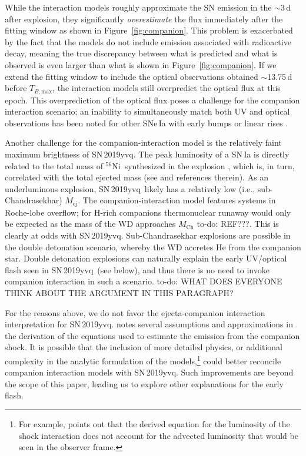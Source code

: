 \documentclass[twocolumn]{aastex63}
\newcommand{\todo}[1]{{\color{magenta} to-do: {#1}}}
\newcommand{\tbmax}{$T_{B,\mathrm{max}}$}
\newcommand{\radni}{$^{56}$Ni}
\newcommand{\sn}{SN\,2019yvq}
\begin{document}
While the interaction models roughly approximate the SN emission in the
$\sim$3\,d after explosion, they significantly \textit{overestimate} the flux
immediately after the fitting window as shown in Figure~\ref{fig:companion}.
This problem is exacerbated by the fact that the models do not include
emission associated with radioactive decay, meaning the true discrepancy
between what is predicted and what is observed is even larger than what is
shown in Figure~\ref{fig:companion}. If we extend the fitting window to
include the optical observations obtained $\sim$13.75\,d before \tbmax, the
interaction models still overpredict the optical flux at this epoch. This
overprediction of the optical flux poses a challenge for the companion
interaction scenario; an inability to simultaneously match both UV and optical
observations has been noted for other SNe\,Ia with early bumps or linear rises
\citep{Hosseinzadeh17,Miller18}.

Another challenge for the companion-interaction model is the relatively faint
maximum brightness of \sn. The peak luminosity of a SN\,Ia is directly related
to the total mass of \radni\ synthesized in the explosion \citep{Arnett82},
which is, in turn, correlated with the total ejected mass (see
\citealt{Stritzinger06,Scalzo14,Scalzo14a} and references therein). As an
underluminous explosion, \sn\ likely has a relatively low (i.e.,
sub-Chandrasekhar) $M_\mathrm{ej}$. The companion-interaction model features
systems in Roche-lobe overflow; for H-rich companions thermonuclear runaway
would only be expected as the mass of the WD approaches $M_\mathrm{Ch}$
\todo{REF???}. This is clearly at odds with \sn. Sub-Chandrasekhar explosions
are possible in the double detonation scenario, whereby the WD accretes He
from the companion star. Double detonation explosions can naturally explain
the early UV/optical flash seen in \sn\ (see below), and thus there is no need
to invoke companion interaction in such a scenario. \todo{WHAT DOES EVERYONE
THINK ABOUT THE ARGUMENT IN THIS PARAGRAPH?}

For the reasons above, we do not favor the ejecta-companion interaction
interpretation for \sn. \citet{Kasen10a} notes several assumptions and
approximations in the derivation of the equations used to estimate the
emission from the companion shock. It is possible that the inclusion of more
detailed physics, or additional complexity in the analytic formulation of the
models,\footnote{For example, \citet{Kasen10a} points out that the derived
equation for the luminosity of the shock interaction does not account for the
advected luminosity that would be seen in the observer frame.} could better
reconcile companion interaction models with \sn. Such improvements are beyond
the scope of this paper, leading us to explore other explanations for the
early flash.
\end{document}
